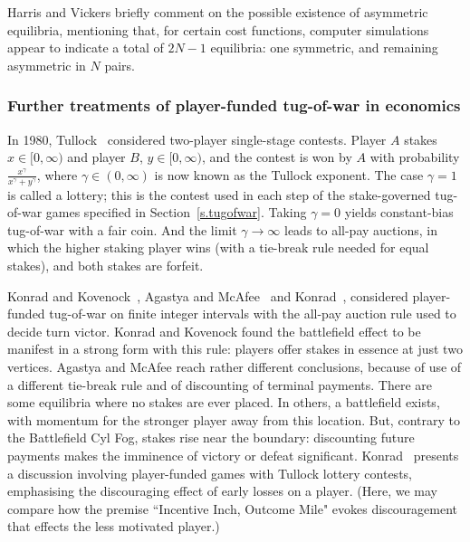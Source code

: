 \documentclass[letterpaper,11pt,oneside,reqno]{amsbook}
\numberwithin{figure}{chapter}
\theoremstyle{definition}
\theoremstyle{definition}
\theoremstyle{definition}
\theoremstyle{definition}
\theoremstyle{definition}
\begin{document}
Harris and Vickers briefly comment on the possible existence of asymmetric equilibria, mentioning that, for certain cost functions, computer simulations appear to indicate a total of $2N-1$ equilibria: one symmetric, and remaining asymmetric in $N$ pairs. 

\medskip

\subsubsection{Further treatments of player-funded tug-of-war in economics}\label{s.tullock}

In 1980, Tullock~\cite{Tullock} considered two-player single-stage contests. Player $A$ stakes $x \in [0,\infty)$ and player $B$, $y \in [0,\infty)$, and the contest is won by $A$ with probability $\tfrac{x^\gamma}{x^\gamma + y^\gamma}$, where $\gamma \in (0,\infty)$ is now known as the Tullock exponent. The case $\gamma =1$ is called a lottery; this is the contest used in each step of the stake-governed tug-of-war games specified in Section~\ref{s.tugofwar}. Taking $\gamma=0$ yields constant-bias tug-of-war with a fair coin. And
the limit $\gamma \to \infty$ leads to  all-pay auctions, in which the higher staking player wins (with a tie-break rule needed for equal stakes), and both stakes are forfeit. 

Konrad and Kovenock~\cite{KonradKovenock05}, Agastya and McAfee~\cite{AgastyaMcAfee} and Konrad~\cite{Konrad2012}, considered player-funded tug-of-war on finite integer intervals with the 
all-pay auction rule used to decide turn victor. Konrad and Kovenock found the battlefield effect to be manifest in a strong form with this rule: players offer stakes in essence at just two vertices. Agastya and McAfee reach rather different conclusions, because of use of a different tie-break rule and of discounting of terminal payments. There are some equilibria where no stakes are ever placed. In others, a battlefield exists, with momentum for the stronger player away from this location. But, contrary to the Battlefield Cyl Fog, stakes rise near the boundary: discounting future payments makes the imminence of victory or defeat significant.  Konrad~\cite{Konrad2012} presents a discussion involving player-funded games with Tullock lottery contests, emphasising the discouraging effect of early losses on a player. (Here, we may compare how the premise ``Incentive Inch, Outcome Mile" evokes discouragement that effects the less motivated player.) 
\end{document}
